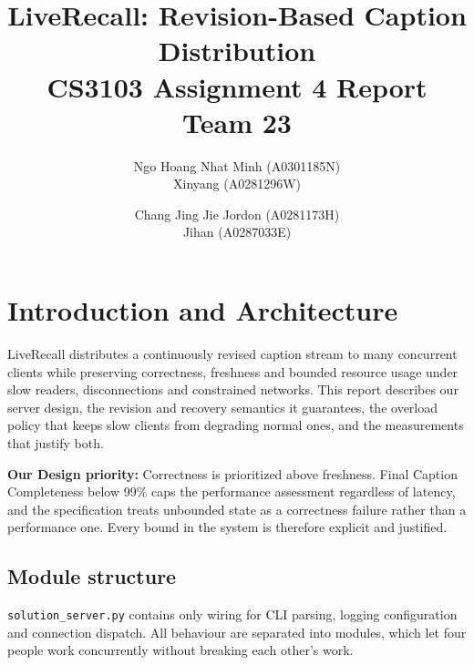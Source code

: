 \documentclass[11pt,a4paper]{article}
\title{\vspace{-1.5em}LiveRecall: Revision-Based Caption Distribution\\
\large CS3103 Assignment 4 Report\\
\large Team 23}
\author{\small Ngo Hoang Nhat Minh (A0301185N) \\ \small Xinyang (A0281296W) \and \small Chang Jing Jie Jordon (A0281173H) \\ \small Jihan (A0287033E)}
\date{}
\begin{document}
\maketitle
\vspace{-2em}

\section{Introduction and Architecture}

LiveRecall distributes a continuously revised caption stream to many
concurrent clients while preserving correctness, freshness and bounded
resource usage under slow readers, disconnections and constrained
networks. This report describes our server design, the revision and
recovery semantics it guarantees, the overload policy that keeps slow
clients from degrading normal ones, and the measurements that justify
both.

\textbf{Our Design priority:} Correctness is prioritized above freshness. Final Caption Completeness below 99\% caps the performance
assessment regardless of latency, and the specification treats
unbounded state as a correctness failure rather than a performance one.
Every bound in the system is therefore explicit and justified.

\subsection{Module structure}

\texttt{solution\_server.py} contains only wiring for CLI parsing,
logging configuration and connection dispatch. All behaviour are separated into
modules, which let four people work concurrently without breaking each other's work.
\end{document}
